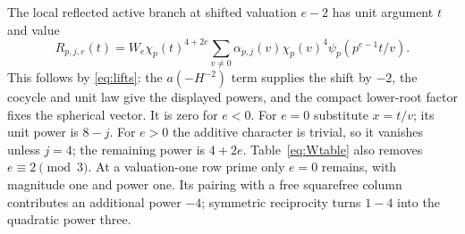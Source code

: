 \documentclass[11pt,a4paper]{article}
\numberwithin{equation}{section}
\theoremstyle{definition}
\theoremstyle{remark}
\begin{document}
The local reflected active branch at shifted valuation $e-2$ has unit argument $t$ and value
\begin{equation}\label{eq:localR}
 R_{p,j,e}(t)=W_e\chi_p(t)^{4+2e}
     \sum_{v\ne0}\alpha_{p,j}(v)\chi_p(v)^4\psi_p(p^{e-1}t/v).
\end{equation}
This follows by \eqref{eq:lifts}: the $a(-H^{-2})$ term supplies the shift by $-2$, the cocycle and unit law give the displayed powers, and the compact lower-root factor fixes the spherical vector. It is zero for $e<0$. For $e=0$ substitute $x=t/v$; its unit power is $8-j$. For $e>0$ the additive character is trivial, so it vanishes unless $j=4$; the remaining power is $4+2e$. Table~\eqref{eq:Wtable} also removes $e\equiv2\pmod3$. At a valuation-one row prime only $e=0$ remains, with magnitude one and power one. Its pairing with a free squarefree column contributes an additional power $-4$; symmetric reciprocity turns $1-4$ into the quadratic power three.
\end{document}

